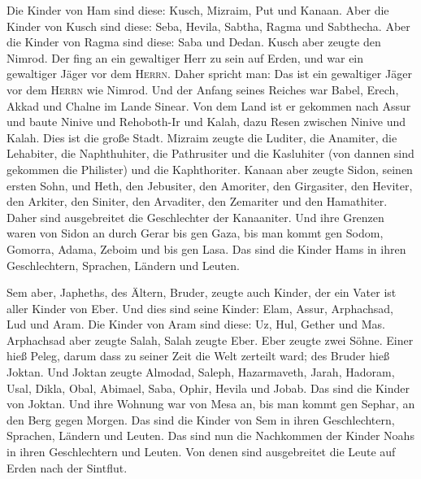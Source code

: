  Die Kinder von Ham sind diese: Kusch, Mizraim, Put und
Kanaan.  Aber die Kinder von Kusch sind diese: Seba,
Hevila, Sabtha, Ragma und Sabthecha. Aber die Kinder von Ragma sind
diese: Saba und Dedan.  Kusch aber zeugte den Nimrod. Der
fing an ein gewaltiger Herr zu sein auf Erden,  und war
ein gewaltiger Jäger vor dem \textsc{Herrn}. Daher spricht man: Das ist
ein gewaltiger Jäger vor dem \textsc{Herrn} wie Nimrod. 
Und der Anfang seines Reiches war Babel, Erech, Akkad und Chalne im
Lande Sinear.  Von dem Land ist er gekommen nach Assur
und baute Ninive und Rehoboth-Ir und Kalah,  dazu Resen
zwischen Ninive und Kalah. Dies ist die große Stadt. 
Mizraim zeugte die Luditer, die Anamiter, die Lehabiter, die
Naphthuhiter,  die Pathrusiter und die Kasluhiter (von
dannen sind gekommen die Philister) und die Kaphthoriter.
 Kanaan aber zeugte Sidon, seinen ersten Sohn, und Heth,
 den Jebusiter, den Amoriter, den Girgasiter,
 den Heviter, den Arkiter, den Siniter, 
den Arvaditer, den Zemariter und den Hamathiter. Daher sind ausgebreitet
die Geschlechter der Kanaaniter.  Und ihre Grenzen waren
von Sidon an durch Gerar bis gen Gaza, bis man kommt gen Sodom, Gomorra,
Adama, Zeboim und bis gen Lasa.  Das sind die Kinder Hams
in ihren Geschlechtern, Sprachen, Ländern und Leuten.

 Sem aber, Japheths, des Ältern, Bruder, zeugte auch
Kinder, der ein Vater ist aller Kinder von Eber.  Und
dies sind seine Kinder: Elam, Assur, Arphachsad, Lud und Aram.
 Die Kinder von Aram sind diese: Uz, Hul, Gether und Mas.
 Arphachsad aber zeugte Salah, Salah zeugte Eber.
 Eber zeugte zwei Söhne. Einer hieß Peleg, darum dass zu
seiner Zeit die Welt zerteilt ward; des Bruder hieß Joktan.
 Und Joktan zeugte Almodad, Saleph, Hazarmaveth, Jarah,
 Hadoram, Usal, Dikla,  Obal, Abimael,
Saba,  Ophir, Hevila und Jobab. Das sind die Kinder von
Joktan.  Und ihre Wohnung war von Mesa an, bis man kommt
gen Sephar, an den Berg gegen Morgen.  Das sind die
Kinder von Sem in ihren Geschlechtern, Sprachen, Ländern und Leuten.
 Das sind nun die Nachkommen der Kinder Noahs in ihren
Geschlechtern und Leuten. Von denen sind ausgebreitet die Leute auf
Erden nach der Sintflut.

